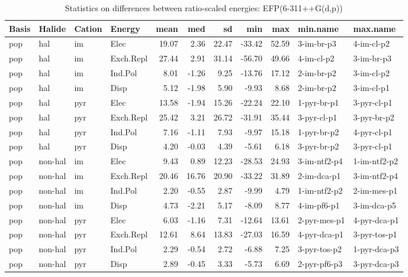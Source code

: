 \documentclass[a4paper]{article}
\begin{document}
\begin{table}[ht]
\centering
\begin{tabular}{llllrrrrrll}
  \hline
Basis & Halide & Cation & Energy & mean & med & sd & min & max & min.name & max.name \\ 
  \hline
pop & hal & im & Elec & 19.07 & 2.36 & 22.47 & -33.42 & 52.59 & 3-im-br-p3 & 4-im-cl-p2 \\ 
  pop & hal & im & Exch.Repl & 27.44 & 2.91 & 31.14 & -56.70 & 49.66 & 4-im-cl-p2 & 3-im-br-p3 \\ 
  pop & hal & im & Ind.Pol & 8.01 & -1.26 & 9.25 & -13.76 & 17.12 & 2-im-br-p2 & 3-im-cl-p2 \\ 
  pop & hal & im & Disp & 5.12 & -1.98 & 5.90 & -9.93 & 8.68 & 2-im-br-p2 & 3-im-cl-p1 \\ 
  pop & hal & pyr & Elec & 13.58 & -1.94 & 15.26 & -22.24 & 22.10 & 1-pyr-br-p1 & 3-pyr-cl-p1 \\ 
  pop & hal & pyr & Exch.Repl & 25.42 & 3.21 & 26.72 & -31.91 & 35.44 & 3-pyr-cl-p1 & 3-pyr-br-p2 \\ 
  pop & hal & pyr & Ind.Pol & 7.16 & -1.11 & 7.93 & -9.97 & 15.18 & 1-pyr-br-p2 & 4-pyr-cl-p1 \\ 
  pop & hal & pyr & Disp & 4.20 & -0.03 & 4.39 & -5.61 & 6.18 & 3-pyr-br-p2 & 3-pyr-cl-p1 \\ 
  pop & non-hal & im & Elec & 9.43 & 0.89 & 12.23 & -28.53 & 24.93 & 3-im-ntf2-p4 & 1-im-ntf2-p2 \\ 
  pop & non-hal & im & Exch.Repl & 20.46 & 16.76 & 20.90 & -33.22 & 31.89 & 2-im-dca-p1 & 3-im-ntf2-p4 \\ 
  pop & non-hal & im & Ind.Pol & 2.20 & -0.55 & 2.87 & -9.99 & 4.79 & 1-im-ntf2-p2 & 2-im-mes-p1 \\ 
  pop & non-hal & im & Disp & 4.73 & -2.21 & 5.17 & -8.09 & 8.77 & 4-im-pf6-p1 & 3-im-dca-p5 \\ 
  pop & non-hal & pyr & Elec & 6.03 & -1.16 & 7.31 & -12.64 & 13.61 & 2-pyr-mes-p1 & 4-pyr-dca-p1 \\ 
  pop & non-hal & pyr & Exch.Repl & 12.61 & 8.64 & 13.83 & -27.03 & 16.59 & 4-pyr-dca-p1 & 3-pyr-tos-p1 \\ 
  pop & non-hal & pyr & Ind.Pol & 2.29 & -0.54 & 2.72 & -6.88 & 7.25 & 3-pyr-tos-p2 & 1-pyr-dca-p3 \\ 
  pop & non-hal & pyr & Disp & 2.89 & -0.45 & 3.33 & -5.73 & 6.69 & 2-pyr-pf6-p3 & 3-pyr-dca-p3 \\ 
   \hline
\end{tabular}
\caption{Statistics on differences between ratio-scaled energies: EFP(6-311++G(d,p))}
\end{table}
\end{document}

